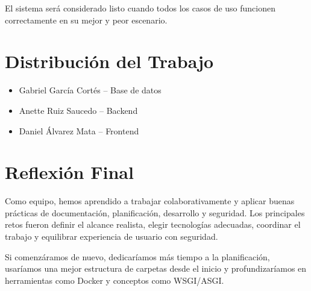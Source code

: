 \documentclass[12pt]{article}
\begin{document}
El sistema será considerado listo cuando todos los casos de uso funcionen correctamente en su mejor y peor escenario.

\section{Distribución del Trabajo}
\begin{itemize}
  \item Gabriel García Cortés – Base de datos
  \item Anette Ruiz Saucedo – Backend
  \item Daniel Álvarez Mata – Frontend
\end{itemize}

\section{Reflexión Final}
Como equipo, hemos aprendido a trabajar colaborativamente y aplicar buenas prácticas de documentación, planificación, desarrollo y seguridad. Los principales retos fueron definir el alcance realista, elegir tecnologías adecuadas, coordinar el trabajo y equilibrar experiencia de usuario con seguridad.

Si comenzáramos de nuevo, dedicaríamos más tiempo a la planificación, usaríamos una mejor estructura de carpetas desde el inicio y profundizaríamos en herramientas como Docker y conceptos como WSGI/ASGI.
\end{document}
